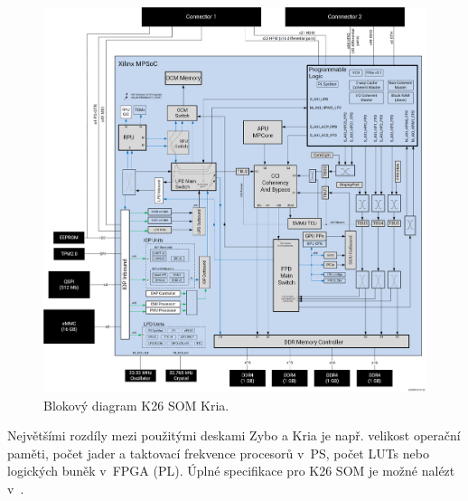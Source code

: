 \documentclass[a4paper, twoside, 11pt]{article}
\newcommand{\fbar}{\FloatBarrier}
\begin{document}
						\begin{figure}[htbp!]
							\centering
								\includegraphics[width=1\textwidth]{src/jpg/xilinx-kria-k26-block-diagram.jpg} 
								\caption{Blokový diagram K26 SOM Kria. \cite{kria-k26-som-ds}}
								\label{fig:xilinx-kria-k26-block-diagram}
						\end{figure}
						\fbar

						Největšími rozdíly mezi použitými deskami Zybo a Kria je např. velikost operační paměti, počet jader a taktovací frekvence procesorů v~PS, počet LUTs nebo logických buněk v~FPGA (PL). Úplné specifikace pro K26 SOM je možné nalézt v~\cite{kria-k26-som-ds}.
\end{document}
